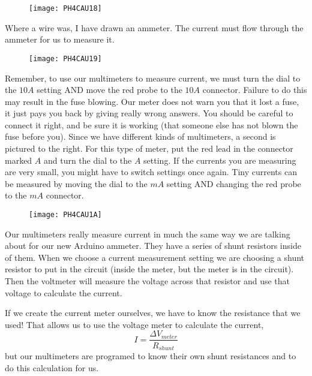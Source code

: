 \begin{figure}[h!]
	\centering
     \texttt{[image: PH4CAU18]}
\end{figure}

Where a wire was, I have drawn an
ammeter. The current must flow through the ammeter for us to measure it.

\begin{figure}[h!]
	\centering
    \texttt{[image: PH4CAU19]}
\end{figure} 

Remember, to use our multimeters
to measure current, we must turn the dial to the $10\unit{A}$ setting AND
move the red probe to the $10\unit{A}$ connector. Failure to do this may
result in the fuse blowing. Our meter does not warn you that it lost a fuse,
it just pays you back by giving really wrong answers. You should be careful
to connect it right, and be sure it is working (that someone else has not
blown the fuse before you). Since we have different kinds of multimeters, a
second is pictured to the right. For this type of meter, put the red lead in
the connector marked $A$ and turn the dial to the $A$ setting. If the
currents you are measuring are very small, you might have to switch settings
once again. Tiny currents can be measured by moving the dial to the $\unit{mA%
}$ setting AND changing the red probe to the $\unit{mA}$ connector.

\begin{figure}[h!]
	\centering
    \texttt{[image: PH4CAU1A]}
\end{figure}

Our multimeters really measure current in much the same way we are talking
about for our new Arduino ammeter. They have a series of shunt resistors
inside of them. When we choose a current measurement setting we are choosing
a shunt resistor to put in the circuit (inside the meter, but the meter is
in the circuit). Then the voltmeter will measure the voltage across that
resistor and use that voltage to calculate the current.

If we create the current meter ourselves, we have to know the resistance
that we used! That allows us to use the voltage meter to calculate the
current,%
\begin{equation*}
I=\frac{\Delta V_{meter}}{R_{shunt}}
\end{equation*}%
but our multimeters are programed to know their own shunt resistances and to
do this calculation for us.

